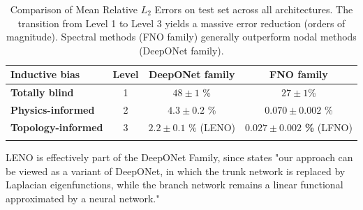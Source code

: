 \begin{table}[htbp]
    \centering
    \begin{threeparttable} %
        \caption{Comparison of Mean Relative $L_2$ Errors on test set across all architectures. 
        The transition from Level 1 to Level 3 yields a massive error reduction (orders of magnitude). 
        Spectral methods (FNO family) generally outperform nodal methods (DeepONet family).}
        \label{tab:error_comparison}

        \renewcommand{\arraystretch}{1.3}
        \setlength{\tabcolsep}{12pt}
        
        \begin{tabular}{lccc}
            \toprule
            \textbf{Inductive bias} & \textbf{Level} & \textbf{DeepONet family}\tnote{a} & \textbf{FNO family} \\ %
            \midrule
            
            \textbf{Totally blind} & 1 & $48 \pm 1$ \% & $27 \pm 1$\% \\
            \arrayrulecolor{black!30}\midrule 
            
            \textbf{Physics-informed} & 2 & $4.3 \pm 0.2$ \% & $0.070 \pm 0.002$ \% \\
            \arrayrulecolor{black!30}\midrule
    
            \textbf{Topology-informed} & 3 & $2.2 \pm 0.1$ \% \footnotesize{(LENO)} & $\mathbf{0.027 \pm 0.002}$ \textbf{\%} \footnotesize{(LFNO)} \\
            
            \arrayrulecolor{black}\bottomrule
        \end{tabular}
        
        \begin{tablenotes}
            \small
            \item[a] LENO is effectively part of the DeepONet Family, since \cite{wang2025laplacian} states "our approach can be viewed as a variant of DeepONet, in which the trunk network is replaced by Laplacian eigenfunctions, while the branch network remains a linear functional approximated by a neural network."
        \end{tablenotes}
    \end{threeparttable}
\end{table}


